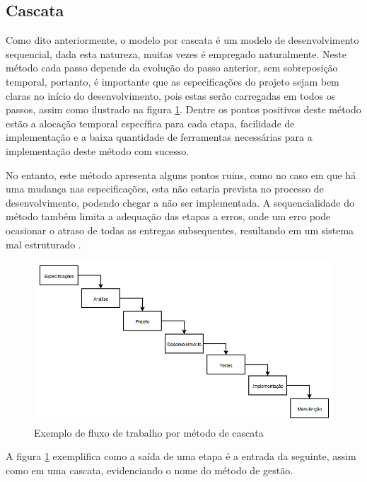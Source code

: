 \subsection{Cascata}
Como dito anteriormente, o modelo por cascata é um modelo de desenvolvimento sequencial, dada esta natureza, muitas vezes é empregado naturalmente. Neste método
cada passo depende da evolução do passo anterior, sem sobreposição temporal, portanto, é importante que as especificações do projeto sejam bem claras no início
do desenvolvimento, pois estas serão carregadas em todos os passos, assim como ilustrado na figura \ref{fig:Meth-Waterfall}. Dentre os pontos positivos deste 
método estão a alocação temporal específica para cada etapa, facilidade de implementação e a baixa quantidade de ferramentas necessárias para a implementação deste método com sucesso.

No entanto, este método apresenta alguns pontos ruins, como no caso em que há uma mudança nas especificações, esta não estaria prevista no processo de 
desenvolvimento, podendo chegar a não ser implementada. A sequencialidade do método também limita a adequação das etapas a erros, onde um erro pode ocasionar 
o atraso de todas as entregas subsequentes, resultando em um sistema mal estruturado \cite{balaji2012waterfall}. 

\begin{figure}[h]
\caption{Exemplo de fluxo de trabalho por método de cascata}    
\begin{centering}
\includegraphics[width=1\columnwidth]{images/meth/Meth-Waterfall.png}
\par\end{centering}

\label{fig:Meth-Waterfall}

\end{figure}

A figura \ref{fig:Meth-Waterfall} exemplifica como a saída de uma etapa é a entrada da seguinte, assim como em uma cascata, evidenciando o nome do método de gestão.

